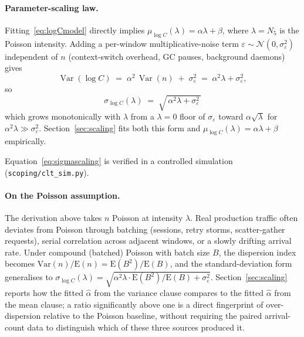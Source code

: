 \documentclass[11pt,a4paper]{article}
\begin{document}
\paragraph{Parameter-scaling law.}
Fitting~\eqref{eq:logCmodel} directly implies
$\mu_{\log C}(\lambda) = \alpha\lambda + \beta$, where $\lambda = N_5$ is the
Poisson intensity. Adding a per-window multiplicative-noise term
$\varepsilon \sim \mathcal{N}(0, \sigma_\varepsilon^2)$ independent of $n$
(context-switch overhead, GC pauses, background daemons) gives
\begin{equation}
  \operatorname{Var}(\log C) \;=\; \alpha^2\,\operatorname{Var}(n)
  \;+\; \sigma_\varepsilon^2 \;=\; \alpha^2 \lambda + \sigma_\varepsilon^2,
\end{equation}
so
\begin{equation}
  \sigma_{\log C}(\lambda) \;=\; \sqrt{\,\alpha^2 \lambda + \sigma_\varepsilon^2\,}
  \label{eq:sigmascaling}
\end{equation}
which grows monotonically with $\lambda$ from a $\lambda=0$ floor of
$\sigma_\varepsilon$ toward $\alpha\sqrt{\lambda}$ for
$\alpha^2\lambda \gg \sigma_\varepsilon^2$. Section~\ref{sec:scaling} fits
both this form and $\mu_{\log C}(\lambda) = \alpha\lambda + \beta$ empirically.

Equation~\eqref{eq:sigmascaling} is verified in a controlled simulation
(\texttt{scoping/clt\_sim.py}).

\paragraph{On the Poisson assumption.} The derivation above takes $n$
Poisson at intensity $\lambda$. Real production traffic often deviates
from Poisson through batching (sessions, retry storms, scatter-gather
requests), serial correlation across adjacent windows, or a slowly
drifting arrival rate. Under compound (batched) Poisson with batch
size $B$, the dispersion index becomes $\text{Var}(n)/\text{E}(n) =
\text{E}(B^2)/\text{E}(B)$, and the standard-deviation form generalises
to $\sigma_{\log C}(\lambda) = \sqrt{\alpha^2\lambda \cdot
\text{E}(B^2)/\text{E}(B) + \sigma_\varepsilon^2}$. Section~\ref{sec:scaling}
reports how the fitted $\hat\alpha$ from the variance clause compares to
the fitted $\hat\alpha$ from the mean clause; a ratio significantly
above one is a direct fingerprint of over-dispersion relative to the
Poisson baseline, without requiring the paired arrival-count data to
distinguish which of these three sources produced it.
\end{document}
